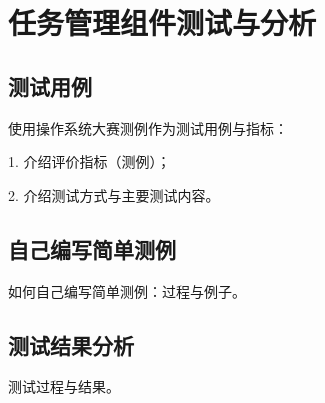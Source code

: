 
\chapter{任务管理组件测试与分析}

\section{测试用例}

使用操作系统大赛测例作为测试用例与指标：

1. 介绍评价指标（测例）；

2. 介绍测试方式与主要测试内容。


\section{自己编写简单测例}

如何自己编写简单测例：过程与例子。



\section{测试结果分析}

测试过程与结果。
